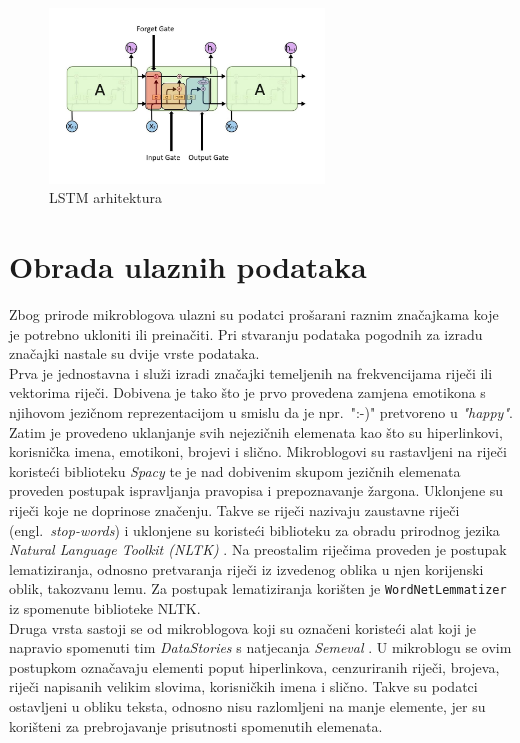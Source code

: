 \documentclass[times, utf8, zavrsni]{fer}
\begin{document}
\begin{figure}[h]
	\centering
	\includegraphics[width=0.65\textwidth]{lstm}
	\caption{\gls{LSTM} arhitektura}
	\label{lstmarh}
\end{figure}



\section{Obrada ulaznih podataka}

Zbog prirode mikroblogova ulazni su podatci prošarani raznim značajkama koje je potrebno ukloniti ili preinačiti. Pri stvaranju podataka pogodnih za izradu značajki nastale su dvije vrste podataka.\\
\noindent Prva je jednostavna i služi izradi značajki temeljenih na frekvencijama riječi ili vektorima riječi. Dobivena je tako što je prvo provedena zamjena emotikona s njihovom jezičnom reprezentacijom u smislu da je npr.~":-)" pretvoreno u \emph{"happy"}. Zatim je provedeno uklanjanje svih nejezičnih elemenata kao što su hiperlinkovi, korisnička imena, emotikoni, brojevi i slično. Mikroblogovi su rastavljeni na riječi koristeći biblioteku \emph{Spacy} te je nad dobivenim skupom jezičnih elemenata proveden postupak ispravljanja pravopisa i prepoznavanje žargona. Uklonjene su riječi koje ne doprinose značenju. Takve se riječi nazivaju zaustavne riječi (engl.~\emph{stop-words}) i uklonjene su koristeći biblioteku za obradu prirodnog jezika \emph{Natural Language Toolkit (\gls{NLTK})} \citep{nltk}. Na preostalim riječima proveden je postupak lematiziranja, odnosno pretvaranja riječi iz izvedenog oblika u njen korijenski oblik, takozvanu lemu. Za postupak lematiziranja korišten je \texttt{WordNetLemmatizer} iz spomenute biblioteke \gls{NLTK}.\\
\noindent Druga vrsta sastoji se od mikroblogova koji su označeni koristeći alat koji je napravio spomenuti tim \emph{DataStories} s natjecanja \emph{Semeval} \citep{datastories-Semeval}. U mikroblogu se ovim postupkom označavaju elementi poput hiperlinkova, cenzuriranih riječi, brojeva, riječi napisanih velikim slovima, korisničkih imena i slično. Takve su podatci ostavljeni u obliku teksta, odnosno nisu razlomljeni na manje elemente, jer su korišteni za prebrojavanje prisutnosti spomenutih elemenata.
\end{document}
